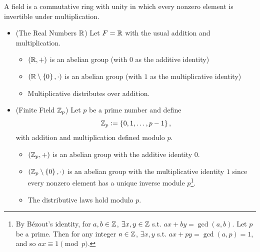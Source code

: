 \documentclass[11pt,openany]{article}
\begin{document}
\begin{example}
A field is a commutative ring with unity in which every nonzero element is invertible under multiplication. \begin{itemize}
	\item (The Real Numbers $\mathbb{R}$) Let $F=\mathbb{R}$ with the usual addition and multiplication. \begin{itemize}
		\item $(\mathbb{R},+)$ is an abelian group (with $0$ as the additive identity)
		\item $(\mathbb{R}\setminus\set{0},\cdot)$ is an abelian group (with $1$ as the multiplicative identity)
		\item Multiplicative distributes over addition.
	\end{itemize}
	\item (Finite Field $\mathbb{Z}_p$) Let $p$ be a prime number and define \[
	\mathbb{Z}_p:=\set{0,1,\dots, p-1},
	\] with addition and multiplication defined modulo $p$. \begin{itemize}
		\item $(\mathbb{Z}_p,+)$ is an abelian group with the additive identity $0$.
		\item $(\mathbb{Z}_p\setminus\set{0},\cdot)$ is an abelian group with the multiplicative identity $1$ since every nonzero element has a unique inverse module $p$\footnote{By Bézout's identity, for $a,b\in\mathbb{Z}$, $\exists x,y\in\mathbb{Z}$ s.t. $ax+by=\gcd(a,b)$. Let $p$ be a prime. Then for any integer $a\in\mathbb{Z}$, $\exists x,y$ s.t. $ax+py=\gcd(a,p)=1$, and so $ax\equiv 1\pmod{p}$.}.
		\item The distributive laws hold modulo $p$.
	\end{itemize}
\end{itemize}
\end{example}
\end{document}
